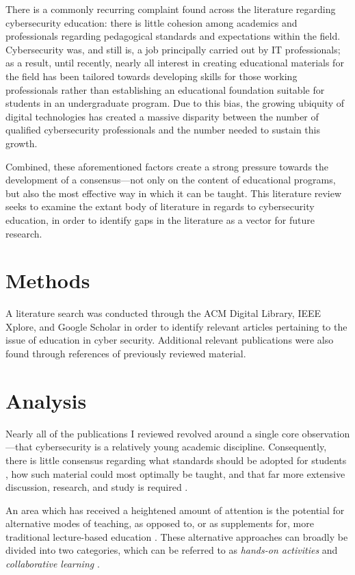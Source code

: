 
    There is a commonly recurring complaint found across the literature regarding cybersecurity education: there is little cohesion among academics and professionals regarding pedagogical standards and expectations within the field. Cybersecurity was, and still is, a job principally carried out by IT professionals; as a result, until recently, nearly all interest in creating educational materials for the field has been tailored towards developing skills for those working professionals rather than establishing an educational foundation suitable for students in an undergraduate program. Due to this bias, the growing ubiquity of digital technologies has created a massive disparity between the number of qualified cybersecurity professionals and the number needed to sustain this growth. 
    
    Combined, these aforementioned factors create a strong pressure towards the development of a consensus---not only on the content of educational programs, but also the most effective way in which it can be taught. This literature review seeks to examine the extant body of literature in regards to cybersecurity education, in order to identify gaps in the literature as a vector for future research.

\section{Methods}

    A literature search was conducted through the ACM Digital Library, IEEE Xplore, and Google Scholar in order to identify relevant articles pertaining to the issue of education in cyber security. Additional relevant publications were also found through references of previously reviewed material.

\section{Analysis}

    Nearly all of the publications I reviewed revolved around a single core observation---that cybersecurity is a relatively young academic discipline. Consequently, there is little consensus regarding what standards should be adopted for students \cite{R-Raj}, how such material could most optimally be taught, and that far more extensive discussion, research, and study is required \cite{Z-Zeng}. 
    
    An area which has received a heightened amount of attention is the potential for alternative modes of teaching, as opposed to, or as supplements for, more traditional lecture-based education \cite{Z-Zeng,N-Eliot,E-Gavas,C-Herr,K-Chung, C-Kussmaul,K-Leune,B-Payne,L-Thomas}. These alternative approaches can broadly be divided into two categories, which can be referred to as \emph{hands-on activities} and \emph{collaborative learning} \cite{P-Deshpande,C-Kussmaul,B-Payne}.

